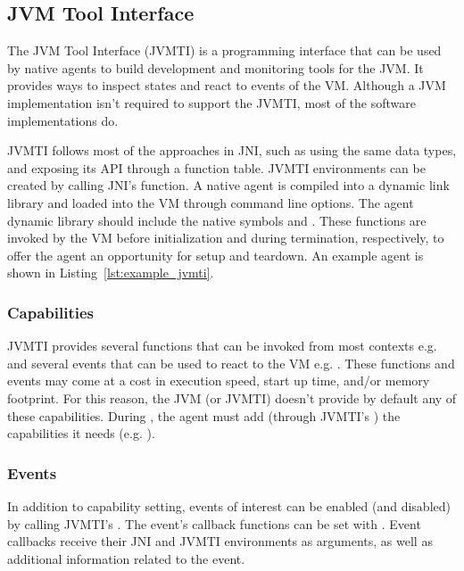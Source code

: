 
\subsection{JVM Tool Interface}

The JVM Tool Interface (JVMTI) is a programming interface that can be used by native agents to build development and monitoring tools for the JVM. It provides ways to inspect states and react to events of the VM. Although a JVM implementation isn't required to support the JVMTI, most of the software implementations do.

JVMTI follows most of the approaches in JNI, such as using the same data types, and exposing its API through a function table. JVMTI environments can be created by calling JNI's \href{https://docs.oracle.com/en/java/javase/11/docs/specs/jni/invocation.html#getenv}{} function. A native agent is compiled into a dynamic link library and loaded into the VM through command line options. The agent dynamic library should include the native symbols  and . These functions are invoked by the VM before initialization and during termination, respectively, to offer the agent an opportunity for setup and teardown. An example agent is shown in Listing~\ref{lst:example_jvmti}.

\subsubsection*{Capabilities}

JVMTI provides several functions that can be invoked from most contexts e.g.  and several events that can be used to react to the VM e.g. . These functions and events may come at a cost in execution speed, start up time, and/or memory footprint. For this reason, the JVM (or JVMTI) doesn't provide by default any of these capabilities. During , the agent must add (through JVMTI's ) the capabilities it needs (e.g. ).

\subsubsection*{Events}

In addition to capability setting, events of interest can be enabled (and disabled) by calling JVMTI's . The event's callback functions can be set with . Event callbacks receive their JNI and JVMTI environments as arguments, as well as additional information related to the event.


